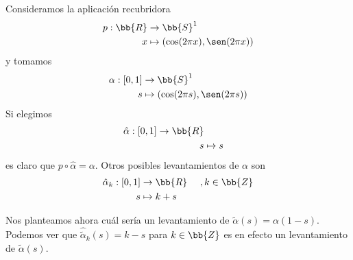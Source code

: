 \begin{ejemplo}
    Consideramos la aplicación recubridora
    \begin{align*}
        p:\bb{R} & \to \bb{S}^1\\
        x & \mapsto (\cos(2\pi x), \sen(2\pi x))
    \end{align*}
    y tomamos
    \begin{align*}
        \alpha: [0,1] & \to \bb{S}^1\\
        s & \mapsto (\cos(2\pi s), \sen(2\pi s))
    \end{align*}
    Si elegimos
    \begin{align*}
        \hat{\alpha} : [0,1] \to \bb{R}\\
        s & \mapsto s
    \end{align*}
    es claro que $p\circ \hat{\alpha} = \alpha$. Otros posibles levantamientos de $\alpha$ son 
    \begin{align*}
        \hat{\alpha}_k : [0,1] & \to \bb{R}\ \ \ \ , k\in \bb{Z}  \\
        s & \mapsto k+s
    \end{align*}
    
    Nos planteamos ahora cuál sería un levantamiento de $\tilde{\alpha}(s) = \alpha(1-s)$. Podemos ver que $\hat{\tilde{\alpha}}_k(s) = k-s$ para $k\in \bb{Z}$ es en efecto un levantamiento de $\tilde{\alpha}(s)$.\\

    \begin{figure}[H]
        \centering
\end{figure}
\end{ejemplo}
